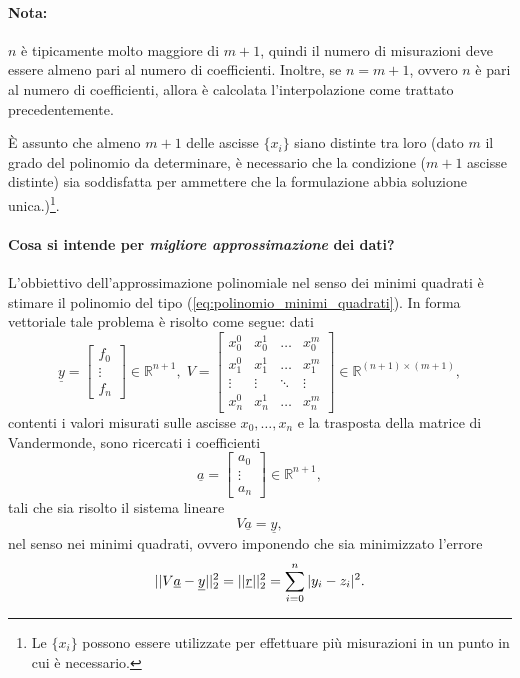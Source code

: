 \paragraph{Nota:} $n$ è tipicamente molto maggiore di $m+1$, quindi il numero di misurazioni deve essere almeno pari al numero di coefficienti. Inoltre, se $n=m+1$, ovvero $n$ è pari al numero di coefficienti, allora è calcolata l'interpolazione come trattato precedentemente.

\begin{remark}\label{rem:ascisse_distinte_polinomio}
     È assunto che almeno $m+1$ delle ascisse $\{x_i\}$ siano distinte tra loro (dato $m$ il grado del polinomio da determinare, è necessario che la condizione ($m+1$ ascisse distinte) sia soddisfatta per ammettere che la formulazione abbia soluzione unica.)\footnote{Le $\{x_i\}$ possono essere utilizzate per effettuare più misurazioni in un punto in cui è necessario.}.
\end{remark}

\paragraph{Cosa si intende per \textit{migliore approssimazione} dei dati?} L'obbiettivo dell'approssimazione polinomiale nel senso dei minimi quadrati è stimare il polinomio del tipo (\ref{eq:polinomio_minimi_quadrati}). In forma vettoriale tale problema è risolto come segue: dati
\begin{equation}
	\underline{y}=
	\begin{bmatrix}
		f_0\\
		\vdots\\
		f_n
	\end{bmatrix}\in\mathbb{R}^{n+1},\; 
	V=\begin{bmatrix}
		x_0^0 & x_0^1 & \hdots & x_0^m\\
		x_1^0 & x_1^1 & \hdots & x_1^m\\
		\vdots & \vdots &\ddots & \vdots\\
		x_n^0 & x_n^1 & \hdots & x_n^m
	\end{bmatrix}\in\mathbb R^{(n+1)\times (m+1)},
\end{equation}
contenti i valori misurati sulle ascisse $x_0, \hdots, x_n$ e la trasposta della matrice di Vandermonde, sono ricercati i coefficienti
\begin{equation*}
	\underline{a}=
	\begin{bmatrix}
		a_0\\
		\vdots\\
		a_n
	\end{bmatrix}\in\mathbb{R}^{n+1},
\end{equation*}
tali che sia risolto il sistema lineare
\begin{equation}\label{eq:Va=y}
	V\underline{a}=\underline{y},
\end{equation}
nel senso nei minimi quadrati, ovvero imponendo che sia minimizzato l'errore
\begin{equation*}
	||V\uline a - \uline y||_2^2 = ||\underline r||_2^2=\sum_{i=0}^n|y_i-z_i|^2.
\end{equation*}

